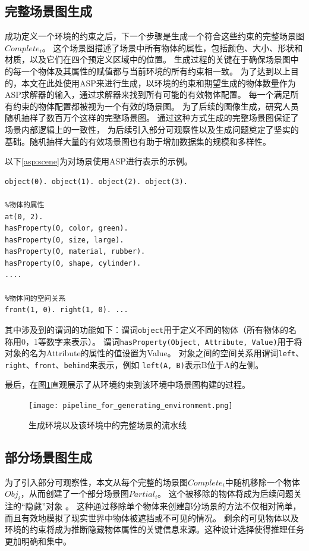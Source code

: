\subsection{完整场景图生成}
成功定义一个环境的约束之后，下一个步骤是生成一个符合这些约束的完整场景图$Complete_i$。
这个场景图描述了场景中所有物体的属性，包括颜色、大小、形状和材质，以及它们在四个预定义区域中的位置。
生成过程的关键在于确保场景图中的每一个物体及其属性的赋值都与当前环境的所有约束相一致。
为了达到以上目的，本文在此处使用ASP来进行生成，以环境的约束和期望生成的物体数量作为ASP求解器的输入，通过求解器来找到所有可能的有效物体配置。
每一个满足所有约束的物体配置都被视为一个有效的场景图。
为了后续的图像生成，研究人员随机抽样了数百万个这样的完整场景图。
通过这种方式生成的完整场景图保证了场景内部逻辑上的一致性，
为后续引入部分可观察性以及生成问题奠定了坚实的基础。随机抽样大量的有效场景图也有助于增加数据集的规模和多样性。   

以下\ref{asp:scene}为对场景使用ASP进行表示的示例。
\begin{lstlisting}[label=asp:scene]
%场景中的物体
object(0). object(1). object(2). object(3).

%物体的属性
at(0, 2).
hasProperty(0, color, green).
hasProperty(0, size, large).
hasProperty(0, material, rubber).
hasProperty(0, shape, cylinder).
....

%物体间的空间关系
front(1, 0). right(1, 0). ...
\end{lstlisting}

其中涉及到的谓词的功能如下：谓词\texttt{object}用于定义不同的物体（所有物体的名称用0，1等数字来表示）。
谓词\texttt{hasProperty(Object, Attribute, Value)}用于将对象的名为Attribute的属性的值设置为Value。
对象之间的空间关系用谓词\texttt{left}、\texttt{right}、\texttt{front}、\texttt{behind}来表示，例如
\texttt{left(A, B)}表示B位于A的左侧。

最后，在图\ref{pipeline_for_generating_environment}直观展示了从环境约束到该环境中场景图构建的过程。
\begin{figure}
    \centering
    \texttt{[image: pipeline\_for\_generating\_environment.png]}
    \caption{生成环境以及该环境中的完整场景的流水线}
    \label{pipeline_for_generating_environment}
\end{figure}
\subsection{部分场景图生成}
为了引入部分可观察性，本文从每个完整的场景图$Complete_i$中随机移除一个物体$Obj_i$，从而创建了一个部分场景图$Partial_i$。
这个被移除的物体将成为后续问题关注的“隐藏”对象 。
这种通过移除单个物体来创建部分场景的方法不仅相对简单，而且有效地模拟了现实世界中物体被遮挡或不可见的情况。
剩余的可见物体以及环境的约束将成为推断隐藏物体属性的关键信息来源。这种设计选择使得推理任务更加明确和集中。
